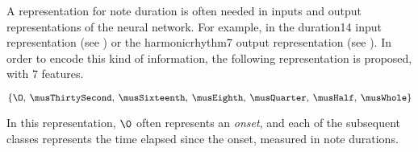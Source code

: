 
A representation for note duration is often needed in inputs
and output representations of the neural network. For
example, in the \gls{duration14} input representation (see
) or the \gls{harmonicrhythm7} output
representation (see ). In
order to encode this kind of information, the following
representation is proposed, with 7 features.

\begin{equation}
    \{\O,\: \musThirtySecond,\: \musSixteenth,\: \musEighth,\: 
    \musQuarter,\: \musHalf,\: \musWhole \}
\end{equation}

In this representation, $\0$ often represents an
\emph{onset}, and each of the subsequent classes represents
the time elapsed since the onset, measured in note
durations.
